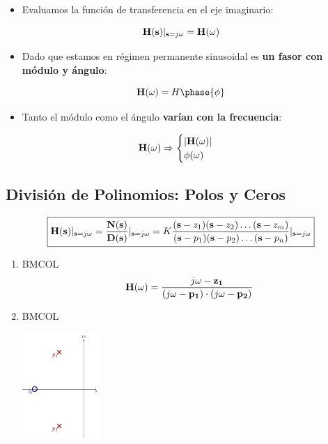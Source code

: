 \begin{itemize}
\item Evaluamos la función de transferencia en el eje imaginario:
\end{itemize}
\[
\mathbf{H}(\mathbf{s})\rvert_{\mathbf{s} = j\omega} = \mathbf{H}(\omega) 
\]
\begin{itemize}
\item Dado que estamos en régimen permanente sinusoidal es \textbf{un fasor con módulo y ángulo}:
\end{itemize}
\[
\fasor{H} = H\phase{\phi}
\]

\begin{itemize}
\item Tanto el módulo como el ángulo \textbf{varían con la frecuencia}:
\end{itemize}

\[
\mathbf{H}(\omega) \Rightarrow
\begin{cases} 
  |\mathbf{H}(\omega)|\\
  \phi(\omega)
\end{cases}
\]


\subsection{División de Polinomios: Polos y Ceros}
\label{sec:org4eaf2b1}

\[
  \boxed{\mathbf{H}(\mathbf{s})\rvert_{\mathbf{s} = j\omega} = \frac{\mathbf{N}(\mathbf{s})}{\mathbf{D}(\mathbf{s})}\rvert_{\mathbf{s} = j\omega} = K \frac{(\mathbf{s}-z_1) (\mathbf{s} - z_2) \ldots (\mathbf{s} - z_m)}{(\mathbf{s}-p_1) (\mathbf{s} - p_2) \ldots (\mathbf{s} - p_n)}\rvert_{\mathbf{s} = j\omega} }
\]
\begin{enumerate}
\item \hfill{}\textsc{BMCOL}
\label{sec:org2752e54}
\[
\mathbf{H}(\omega) = \frac{j\omega - \mathbf{z_1}}{(j\omega - \mathbf{p_1}) \cdot (j\omega - \mathbf{p_2})}
\]
\item \hfill{}\textsc{BMCOL}
\label{sec:org1276689}
\begin{center}
\includegraphics[height=4cm]{../figs/InterpretacionGeometrica0.pdf}
\end{center}
\end{enumerate}

